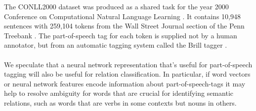 The CONLL2000 dataset was produced as a shared task for the year 2000 Conference on Computational Natural Language Learning \citep{kimsang2000}. It contains 10,948 sentences with 259,104 tokens from the Wall Street Journal section of the Penn Treebank \citep{marcus1999}. The part-of-speech tag for each token is supplied not by a human annotator, but from an automatic tagging system called the Brill tagger \citep{brill1992}.
\\\\
We speculate that a neural network representation that's useful for part-of-speech tagging will also be useful for relation classification. In particular, if word vectors or neural network features encode information about part-of-speech-tags it may help to resolve ambiguity for words that are crucial for identifying semantic relations, such as  words that are verbs in some contexts but nouns in others.

